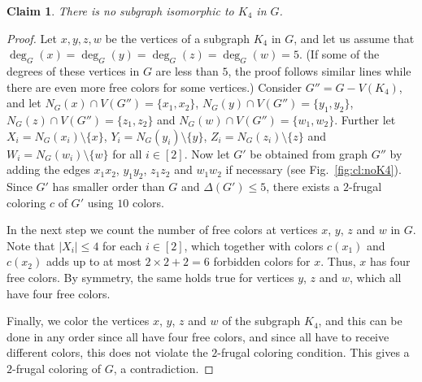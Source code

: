 \documentclass[11pt]{article}
\newtheorem{claim}{Claim}
\begin{document}
\begin{claim} There is no subgraph isomorphic to $K_4$ in $G$.
\label{cl:noK4}
\end{claim} 
\begin{proof}
Let $x,y,z,w$ be the vertices of a subgraph $K_4$ in $G$, and let us assume that $\deg_G(x)=\deg_G(y)=\deg_G(z)=\deg_G(w)=5$. (If some of the degrees of these vertices in $G$ are less than $5$, the proof follows similar lines while there are even more free colors for some vertices.) Consider $G''=G-V(K_4)$, and let $N_G(x) \cap V(G'')=\{x_1,x_2\}$, $N_G(y) \cap V(G'')=\{y_1,y_2\}$, $N_G(z) \cap V(G'')=\{z_1,z_2\}$ and $N_G(w) \cap V(G'')=\{w_1,w_2\}$. Further let $X_i=N_G(x_i)\setminus\{x\}$, $Y_i=N_G(y_i)\setminus\{y\}$, $Z_i=N_G(z_i)\setminus\{z\}$ and $W_i=N_G(w_i)\setminus\{w\}$ for all $i \in [2]$. Now let $G'$ be obtained from graph $G''$ by adding the edges $x_1x_2$, $y_1y_2$, $z_1z_2$ and $w_1w_2$ if necessary (see Fig.~\ref{fig:cl:noK4}). %
Since $G'$ has smaller order than $G$ and $\Delta(G') \le 5$, there exists a $2$-frugal coloring $c$ of $G'$ using $10$ colors.

In the next step we count the number of free colors at vertices $x$, $y$, $z$ and $w$ in $G$. Note that $|X_i| \le 4$ for each $i\in [2]$, which together with colors $c(x_1)$ and $c(x_2)$ adds up to at most $2 \times 2 + 2=6$ forbidden colors for $x$. Thus, $x$ has four free colors. By symmetry, the same holds true for vertices $y$, $z$ and $w$, which all have four free colors.

Finally, we color the vertices $x$, $y$, $z$ and $w$ of the subgraph $K_4$, and this can be done in any order since all have four free colors, and since all have to receive different colors, this does not violate the $2$-frugal coloring condition. This gives a $2$-frugal coloring of $G$, a contradiction.
\end{proof}
\end{document}
